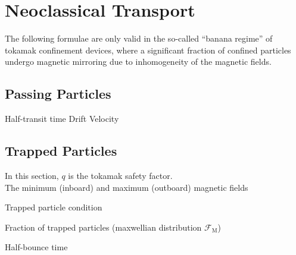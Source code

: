\section{Neoclassical Transport}
The following formulae are only valid in the so-called ``banana
regime'' of tokamak confinement devices, where a significant fraction
of confined particles undergo magnetic mirroring due to inhomogeneity
of the magnetic fields.

\subsection{Passing Particles}
Half-transit time 
Drift Velocity 

\subsection{Trapped Particles}
In this section, $q$ is the tokamak safety factor.\\

\noindent
The minimum (inboard) and maximum (outboard) magnetic fields 

\noindent
Trapped particle condition  %

\noindent
Fraction of trapped particles (maxwellian distribution $\mathcal{F}_\mathrm{M}$) 

\noindent
Half-bounce time

